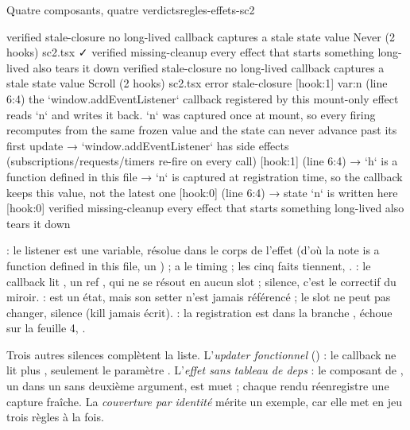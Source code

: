 \begin{exemple}{Quatre composants, quatre verdicts}{regles-effets-sc2}
\begin{sortie}
    verified  stale-closure  no long-lived callback captures a stale state value
  Never  (2 hooks)  sc2.tsx  ✓
    verified  missing-cleanup  every effect that starts something long-lived also tears it down
    verified  stale-closure  no long-lived callback captures a stale state value
  Scroll  (2 hooks)  sc2.tsx
    error  stale-closure  [hook:1]  var:n  (line 6:4)  the `window.addEventListener` callback registered by this mount-only effect reads `n` and writes it back. `n` was captured once at mount, so every firing recomputes from the same frozen value and the state can never advance past its first update
       → `window.addEventListener` has side effects (subscriptions/requests/timers re-fire on every call) [hook:1] (line 6:4)
       → `h` is a function defined in this file
       → `n` is captured at registration time, so the callback keeps this value, not the latest one [hook:0] (line 6:4)
       → state `n` is written here [hook:0]
    verified  missing-cleanup  every effect that starts something long-lived also tears it down
\end{sortie}
 : le listener est une variable, résolue dans le corps de l'effet (d'où la note \og {} is a function defined in this file\fg{}, un ) ;  a le timing  ; les cinq faits tiennent, \Error.  : le callback lit , un ref , qui ne se résout en aucun slot ; silence, c'est le correctif du miroir.  :  est un état, mais son setter n'est jamais référencé ; le slot ne peut pas changer, silence (kill \og jamais écrit\fg{}).  : la registration est dans la branche ,  échoue sur la feuille 4, \Warning.
\end{exemple}

Trois autres silences complètent la liste. L'\emph{updater fonctionnel} () : le callback ne lit plus , seulement le paramètre . L'\emph{effet sans tableau de deps} : le composant  de , un  dans un  sans deuxième argument, est muet ; chaque rendu réenregistre une capture fraîche. La \emph{couverture par identité} mérite un exemple, car elle met en jeu trois règles à la fois.


